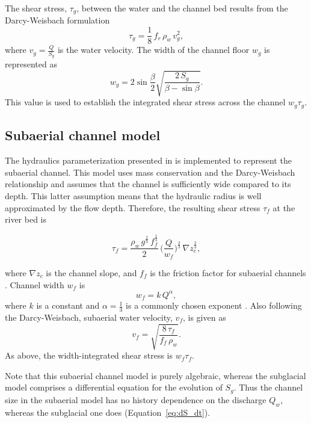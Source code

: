 \documentclass[esurf, manuscript]{copernicus}
\begin{document}
The shear stress, $\tau_g$, between the water and the channel bed results from the Darcy-Weisbach formulation
\begin{equation}
  \label{eq:tau_g}
  \tau_g=\frac{1}{8}\,f_r\,\rho_w\,v_g^2,
\end{equation}
% 
where $v_g = \frac{Q}{S_g}$ is the water velocity.
% 
The width of the channel floor $w_g$ is represented as
\begin{equation}
  \label{eq:dh2wc}
  w_g = 2  \sin \frac{\beta}{2} \sqrt{\frac{2\, S_g}{\beta -\sin \beta}}.
\end{equation}
% 
This value is used to establish the integrated shear stress across the channel $w_g\tau_g$.

\subsection{Subaerial channel  model}
\label{sect:fluv}

The hydraulics parameterization presented in \citet{tucker1997} is implemented to represent the subaerial channel.
This model uses mass conservation and the Darcy-Weisbach relationship and assumes that the channel is sufficiently wide compared to its depth.
This latter assumption means that the hydraulic radius is well approximated by the flow depth.
Therefore, the resulting shear stress $\tau_f$ at the river bed is
\begin{linenomath*}
  \begin{equation}
    \label{eq:DW_tau}
    \tau_f=\frac{\rho_w\,g^{\frac{2}{3}}\,f_f^{\frac{1}{3}}}{2}\, \Big(\frac{Q}{w_f} \Big)^{\frac{2}{3}} \,\nabla z_c^{\frac{2}{3}},
  \end{equation}
\end{linenomath*}
where $\nabla z_c$ is the channel slope, and $f_f$ is the friction factor for subaerial channels \citep{tucker1997}.
Channel width $w_f$ is
\begin{equation}
  \label{eq:wcf}
  w_f = k \, Q^{\alpha},
\end{equation}
% 
where $k$ is a constant and $\alpha=\frac{1}{3}$ is a commonly chosen exponent \citep{leopold1953}.
Also following the Darcy-Weisbach, subaerial water velocity, $v_f$, is given as
\begin{equation}
  \label{eq:vf}
  v_f = \sqrt{\frac{8\,\tau_f}{f_f\,\rho_w}}.
\end{equation}
% 
As above, the width-integrated shear stress is $w_f\tau_f$.

Note that this subaerial channel model is purely algebraic, whereas the subglacial model comprises a differential equation for the evolution of $S_g$.
Thus the channel size in the subaerial model has no history dependence on the discharge $Q_w$, whereas the subglacial one does (Equation~\ref{eq:dS_dt}).
\end{document}
